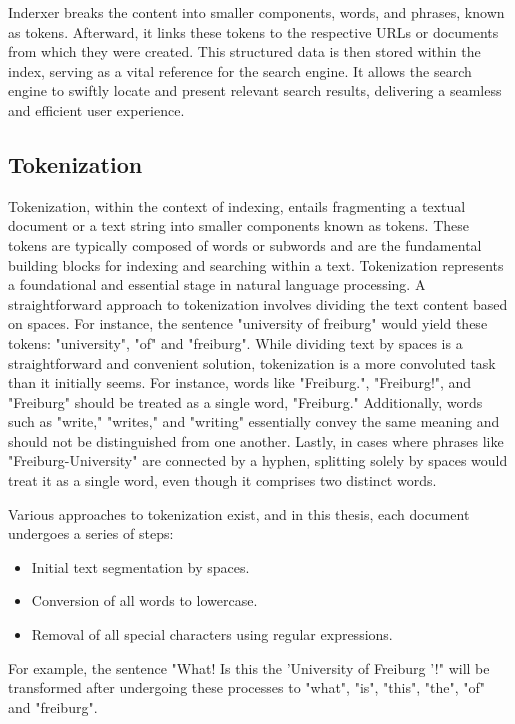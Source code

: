 Inderxer breaks the content into smaller components, words, and phrases, known as tokens. Afterward, it links these tokens to the respective URLs or documents from which they were created. This structured data is then stored within the index, serving as a vital reference for the search engine. It allows the search engine to swiftly locate and present relevant search results, delivering a seamless and efficient user experience.

\subsection*{Tokenization}
Tokenization, within the context of indexing, entails fragmenting a textual document or a text string into smaller components known as tokens. These tokens are typically composed of words or subwords and are the fundamental building blocks for indexing and searching within a text. Tokenization represents a foundational and essential stage in natural language processing. A straightforward approach to tokenization involves dividing the text content based on spaces. For instance, the sentence "university of freiburg" would yield these tokens: "university", "of" and "freiburg".
While dividing text by spaces is a straightforward and convenient solution, tokenization is a more convoluted task than it initially seems. For instance, words like "Freiburg.", "Freiburg!", and "Freiburg" should be treated as a single word, "Freiburg." Additionally, words such as "write," "writes," and "writing" essentially convey the same meaning and should not be distinguished from one another. Lastly, in cases where phrases like "Freiburg-University" are connected by a hyphen, splitting solely by spaces would treat it as a single word, even though it comprises two distinct words.

Various approaches to tokenization exist, and in this thesis, each document undergoes a series of steps:

\begin{itemize}
	\item Initial text segmentation by spaces.
	\item Conversion of all words to lowercase.
	\item Removal of all special characters using regular expressions.
\end{itemize}


For example, the sentence "What! Is this the 'University of Freiburg '!" will be transformed after undergoing these processes to "what", "is", "this", "the", "of" and "freiburg". 

